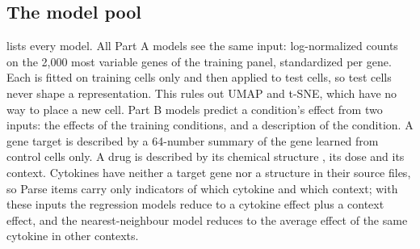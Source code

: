 \documentclass[]{style}
\begin{document}
\subsection{The model pool}
\label{sec:pool}

 lists every model. All Part A models see the same input: log-normalized
counts on the 2,000 most variable genes of the training panel, standardized per gene. Each
is fitted on training cells only and then applied to test cells, so test cells never shape
a representation. This rules out UMAP and t-SNE, which have no way to place a new cell.
Part B models predict a condition's effect from two inputs: the effects of the training
conditions, and a description of the condition. A gene target is described by a
64-number summary of the gene learned from control cells only. A drug is described by its
chemical structure \citep{morgan}, its dose and its context. Cytokines have neither a
target gene nor a structure in their source files, so Parse items carry only indicators of
which cytokine and which context; with these inputs the regression models reduce to a
cytokine effect plus a context effect, and the nearest-neighbour model reduces to the
average effect of the same cytokine in other contexts.
\end{document}
